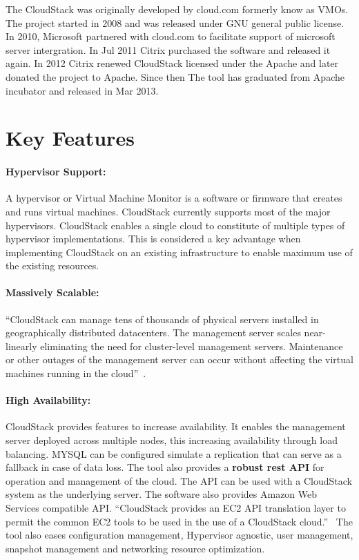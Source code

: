 The CloudStack was originally developed by cloud.com formerly know as
VMOs.  The project started in 2008 and was released under GNU general
public license.  In 2010, Microsoft partnered with cloud.com to 
facilitate support of microsoft server intergration. 
In Jul 2011 Citrix purchased the software and
released it again. In 2012 Citrix renewed CloudStack licensed under
the Apache and later donated the project to Apache.  Since then The
tool has graduated from Apache incubator and released in Mar 2013.


\section{Key Features}

\paragraph{Hypervisor Support:} A hypervisor or Virtual Machine
Monitor is a software or firmware that creates and runs virtual
machines. CloudStack currently supports most of the major hypervisors.
CloudStack enables a single cloud to constitute of multiple types of
hypervisor implementations. This is considered a key advantage when
implementing CloudStack on an existing infrastructure to enable
maximum use of the existing resources. 

\paragraph{Massively Scalable:}
``CloudStack can manage tens of thousands of physical servers installed
in geographically distributed datacenters. The management server
scales near-linearly eliminating the need for cluster-level management
servers. Maintenance or other outages of the management server can
occur without affecting the virtual machines running in the cloud''~\cite{hid-sp18-417-www-cloudstack-scalability}.

\paragraph{High Availability:} CloudStack provides features to
increase availability. It enables the management server deployed
across multiple nodes, this increasing availability through load
balancing. MYSQL can be configured simulate a replication that can
serve as a fallback in case of data loss. The tool also provides a
{\bf robust rest API} for operation and management of the cloud. The
API can be used with a CloudStack system as the underlying server.
The software also provides Amazon Web Services compatible
API. ``CloudStack provides an EC2 API translation layer to permit the
common EC2 tools to be used in the use of a CloudStack
cloud.''~\cite{hid-sp18-417-www-cloudstack-aws} The tool also eases
configuration management, Hypervisor agnostic, user management,
snapshot management and networking resource optimization.

